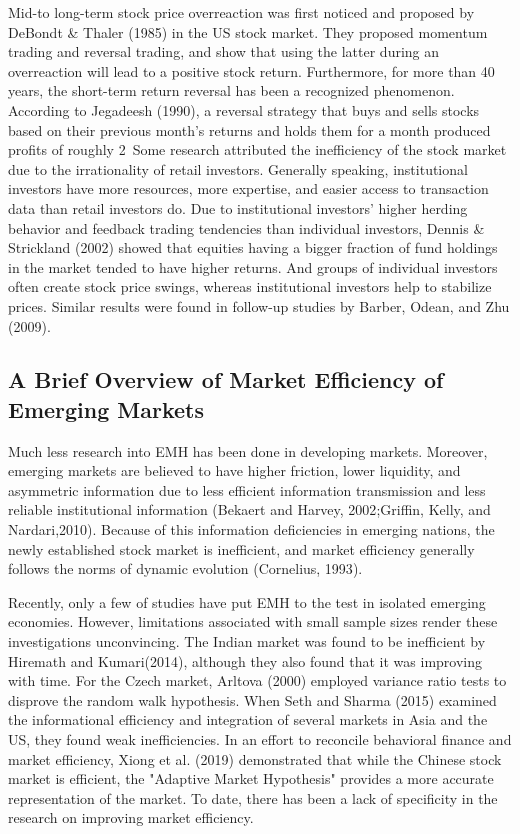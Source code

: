 Mid-to long-term stock price overreaction was first noticed and proposed by DeBondt \& Thaler (1985)\cite{DeBondt1985} in the US stock market. They proposed momentum trading and reversal trading, and show that using the latter during an overreaction will lead to a positive stock return. Furthermore, for more than 40 years, the short-term return reversal has been a recognized phenomenon. According to Jegadeesh (1990)\cite{Jegadeesh1990}, a reversal strategy that buys and sells stocks based on their previous month's returns and holds them for a month produced profits of roughly 2\
Some research attributed the inefficiency of the stock market due to the irrationality of retail investors. Generally speaking, institutional investors have more resources, more expertise, and easier access to transaction data than retail investors do. Due to institutional investors' higher herding behavior and feedback trading tendencies than individual investors, Dennis \& Strickland (2002)\cite{Dennist2002} showed that equities having a bigger fraction of fund holdings in the market tended to have higher returns. And groups of individual investors often create stock price swings, whereas institutional investors help to stabilize prices. Similar results were found in follow-up studies by Barber, Odean, and Zhu (2009)\cite{Barber09}.

\subsection{ A Brief Overview of Market Efficiency of Emerging Markets}
Much less research into EMH has been done in developing markets. Moreover, emerging markets are believed to have higher friction, lower liquidity, and asymmetric information due to less efficient information transmission and less reliable institutional information (Bekaert and Harvey, 2002\cite{Bekaert2002};Griffin, Kelly, and Nardari,2010\cite{Griffin2010}). Because of this information deficiencies in emerging nations, the newly established stock market is inefficient, and market efficiency generally follows the norms of dynamic evolution (Cornelius, 1993\cite{Cornelius1993}).

Recently, only a few of studies have put EMH to the test in isolated emerging economies. However, limitations associated with small sample sizes render these investigations unconvincing. The Indian market was found to be inefficient by Hiremath and Kumari(2014)\cite{Hiremath2014}, although they also found that it was improving with time. For the Czech market, Arltova (2000)\cite{Arlt2000} employed variance ratio tests to disprove the random walk hypothesis. When Seth and Sharma (2015)\cite{Seth2015} examined the informational efficiency and integration of several markets in Asia and the US, they found weak inefficiencies. In an effort to reconcile behavioral finance and market efficiency, Xiong et al. (2019)\cite{Xiong2019} demonstrated that while the Chinese stock market is efficient, the "Adaptive Market Hypothesis" provides a more accurate representation of the market. To date, there has been a lack of specificity in the research on improving market efficiency.


